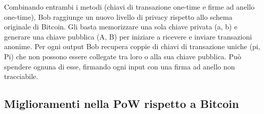 Combinando entrambi i metodi (chiavi di transazione one-time e firme ad
anello one-time), Bob raggiunge un nuovo livello di privacy rispetto
allo schema originale di Bitcoin. Gli basta memorizzare una sola chiave
privata (a, b) e generare una chiave pubblica (A, B) per iniziare a
ricevere e inviare transazioni anonime. Per ogni output Bob recupera
coppie di chiavi di transazione uniche (pi, Pi) che non possono essere
collegate tra loro o alla sua chiave pubblica. Può spendere ognuna di
esse, firmando ogni input con una firma ad anello non tracciabile.

\subsection{Miglioramenti nella PoW rispetto a
Bitcoin}\label{miglioramenti-nella-pow-rispetto-a-bitcoin}

